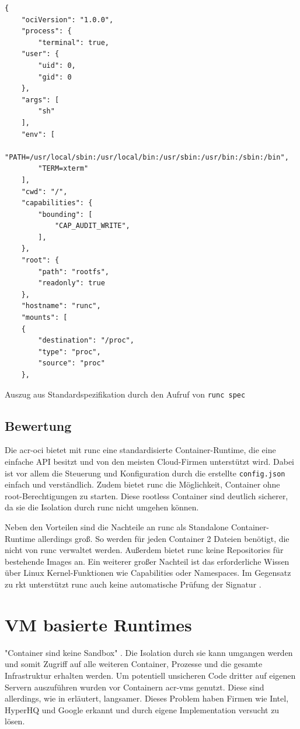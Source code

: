 \begin{listing}[hp]
	\begin{verbatim}
{
	"ociVersion": "1.0.0",
	"process": {
		"terminal": true,
	"user": {
		"uid": 0,
		"gid": 0
	},
	"args": [
		"sh"
	],
	"env": [
		"PATH=/usr/local/sbin:/usr/local/bin:/usr/sbin:/usr/bin:/sbin:/bin",
		"TERM=xterm"
	],
	"cwd": "/",
	"capabilities": {
		"bounding": [
			"CAP_AUDIT_WRITE",
		],
	},
	"root": {
		"path": "rootfs",
		"readonly": true
	},
	"hostname": "runc",
	"mounts": [
	{
		"destination": "/proc",
		"type": "proc",
		"source": "proc"
	},
	\end{verbatim}
	\caption{Auszug aus Standardspezifikation durch den Aufruf von \texttt{runc spec}}
	\label{lst:configJSON}
\end{listing}


\subsection{Bewertung}
\label{sec:compRuncBewertung}

Die \gls{acr-oci} bietet mit runc eine standardisierte Container-Runtime, die eine einfache API besitzt und von den meisten Cloud-Firmen unterstützt wird. Dabei ist vor allem die Steuerung und Konfiguration durch die erstellte \texttt{config.json} einfach und verständlich. Zudem bietet runc die Möglichkeit, Container ohne root-Berechtigungen zu starten. Diese rootless Container sind deutlich sicherer, da sie die Isolation durch runc nicht umgehen können.

Neben den Vorteilen sind die Nachteile an runc als Standalone Container-Runtime allerdings groß. So werden für jeden Container 2 Dateien benötigt, die nicht von runc verwaltet werden. Außerdem bietet runc keine Repositories für bestehende Images an. Ein weiterer großer Nachteil ist das erforderliche Wissen über Linux Kernel-Funktionen wie Capabilities oder Namespaces. Im Gegensatz zu rkt unterstützt runc auch keine automatische Prüfung der Signatur \citep{RktVsOtherProjects}. 

\section{VM basierte Runtimes}
\label{sec:compVMbased}
"Container sind keine Sandbox" \citep{OpenSourcingGVisoraSandboxedContainerRuntime}. Die Isolation durch sie kann umgangen werden und somit Zugriff auf alle weiteren Container, Prozesse und die gesamte Infrastruktur erhalten werden. Um potentiell unsicheren Code dritter auf eigenen Servern auszuführen wurden vor Containern \glspl{acr-vm} genutzt. Diese sind allerdings, wie in  erläutert, langsamer. Dieses Problem haben Firmen wie Intel, HyperHQ und Google erkannt und durch eigene Implementation versucht zu lösen.

